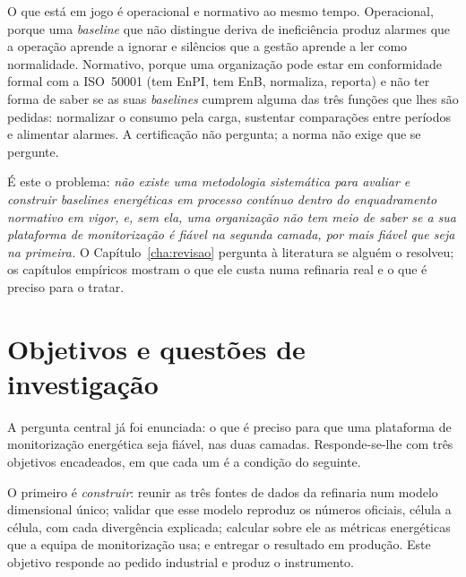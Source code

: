 
O que está em jogo é operacional e normativo ao mesmo tempo.
Operacional, porque uma \emph{baseline} que não distingue deriva de
ineficiência produz alarmes que a operação aprende a ignorar e
silêncios que a gestão aprende a ler como normalidade. Normativo, porque
uma organização pode estar em conformidade formal com a ISO~50001 (tem
EnPI, tem EnB, normaliza, reporta) e não ter forma de saber se as
suas \emph{baselines} cumprem alguma das três funções que lhes são
pedidas: normalizar o consumo pela carga, sustentar comparações entre
períodos e alimentar alarmes. A certificação não pergunta; a norma não
exige que se pergunte.

É este o problema: \emph{não existe uma metodologia sistemática para
avaliar e construir \emph{baselines} energéticas em processo contínuo
dentro do enquadramento normativo em vigor, e, sem ela, uma organização
não tem meio de saber se a sua plataforma de monitorização é fiável na
segunda camada, por mais fiável que seja na primeira.} O
Capítulo~\ref{cha:revisao} pergunta à literatura se alguém o resolveu;
os capítulos empíricos mostram o que ele custa numa refinaria real e o
que é preciso para o tratar.

\section{Objetivos e questões de investigação}
\label{sec:objetivos}

A pergunta central já foi enunciada: o que é preciso para que uma
plataforma de monitorização energética seja fiável, nas duas camadas.
Responde-se-lhe com três objetivos encadeados, em que cada um é a
condição do seguinte.

O primeiro é \emph{construir}: reunir as três fontes de dados da
refinaria num modelo dimensional único; validar que esse modelo
reproduz os números oficiais, célula a célula, com cada divergência
explicada; calcular sobre ele as métricas energéticas que a equipa de
monitorização usa; e entregar o resultado em produção. Este objetivo
responde ao pedido industrial e produz o instrumento.

